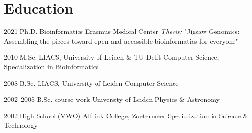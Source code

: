 \documentclass[]{shiltemann-cv}
\begin{document}
\section{Education}

\begin{entrylist}
  \entry
    {2021}
    {Ph.D. Bioinformatics}
    {Erasmus Medical Center}
    {\emph{Thesis:} "Jigsaw Genomics: Assembling the pieces toward open and accessible bioinformatics for everyone"}
\end{entrylist}
\begin{entrylist}


  \entry
    {2010}
    {M.Sc.}
    {LIACS, University of Leiden \& TU Delft}
    {Computer Science, Specialization in Bioinformatics}

\end{entrylist}
\begin{entrylist}

  \entry
    {2008}
    {B.Sc.}
    {LIACS, University of Leiden}
    {Computer Science}
\end{entrylist}
\begin{entrylist}


  \entry
    {2002–2005}
    {B.Sc. course work}
    {University of Leiden}
    {Physics \& Astronomy}
\end{entrylist}
\begin{entrylist}


  \entry
    {2002}
    {High School (VWO)}
    {Alfrink College, Zoetermeer}
    {Specialization in Science \& Technology}
\end{entrylist}
\end{document}
